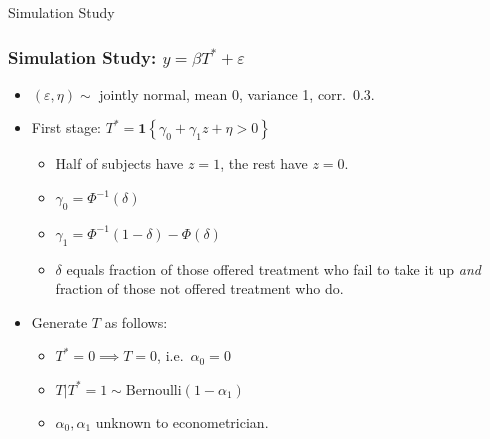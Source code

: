 \documentclass{beamer}
\begin{document}
\appendix
\begin{frame}
  \begin{center}
    \Huge Simulation Study
  \end{center}
\end{frame}
\begin{frame}
  \frametitle{Simulation Study: $y = \beta T^* + \varepsilon$}
  \begin{itemize}
    \item $(\varepsilon, \eta) \sim $ jointly normal, mean 0, variance 1, corr.\ 0.3.
    \item First stage: $T^* = \mathbf{1}\left\{ \gamma_0 + \gamma_1 z + \eta > 0 \right\}$
      \begin{itemize}
        \item Half of subjects have $z=1$, the rest have $z=0$.
        \item $\gamma_0 = \Phi^{-1}(\delta)$
        \item $\gamma_1 = \Phi^{-1}(1-\delta) - \Phi(\delta)$   
        \item $\delta$ equals fraction of those offered treatment who fail to take it up \emph{and} fraction of those not offered treatment who do.
      \end{itemize}
    \item Generate $T$ as follows:
      \begin{itemize}
        \item $T^* = 0 \implies T=0$, i.e.\ $\alpha_0 = 0$
        \item $T|T^*=1 \sim \mbox{Bernoulli}(1-\alpha_1)$
        \item $\alpha_0, \alpha_1$ unknown to econometrician.
      \end{itemize}
  \end{itemize}

  
\end{frame}
\begin{frame}
  \begin{center}
    {}
  \end{center}
\end{frame}
\end{document}

